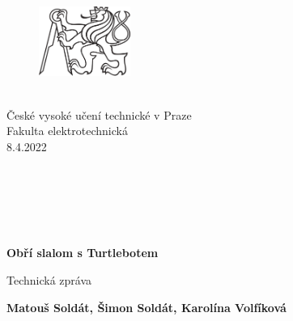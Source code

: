 \documentclass{article}
\begin{document}
\begin{titlepage}
	
            
	\begin{figure}
	\includegraphics[width=3cm]{ctu_logo_black-1.png}
	\end{figure}
	
	\large    
	\noindent
	\\   
       České vysoké učení technické v Praze\\
       Fakulta elektrotechnická\\
       8.4.2022
       \\ \\ \\ \\ \\ \\

	\begin{center}
	\huge
       \textbf{Obří slalom s Turtlebotem}

       \vspace{0.5cm}
       \Large
        Technická zpráva
            
       \vspace{1.2cm}

       {\bf Matouš Soldát, Šimon Soldát, Karolína Volfíková}

       \vfill
       
	\end{center}
       
            
     
            

\end{titlepage}
\end{document}
